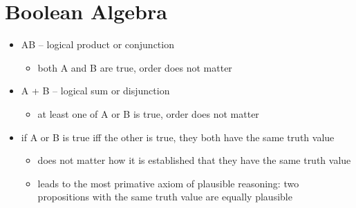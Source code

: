 \documentclass[../jaynes_prob_theory_notes.tex]{subfiles}
\begin{document}
\section{Boolean Algebra}
    \begin{itemize}
        \item AB -- logical product or conjunction
            \begin{itemize}
            \item both A and B are true, order does not matter
            \end{itemize}
        \item A + B -- logical sum or disjunction
            \begin{itemize}
            \item at least one of A or B is true, order does not matter
            \end{itemize}
        \item if A or B is true iff the other is true, they both have the same truth value
            \begin{itemize}
                \item does not matter how it is established that they have the same truth value
                \item leads to the most primative axiom of plausible reasoning: two propositions with the same truth value are equally plausible
            \end{itemize}
    \end{itemize}
    
\end{document}
